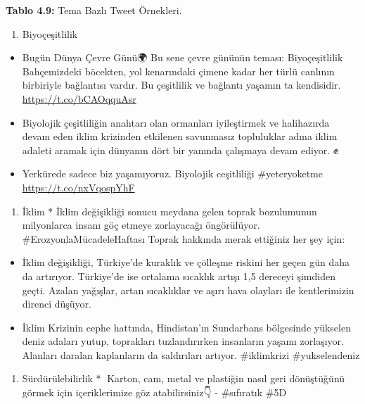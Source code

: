 \documentclass[
]{book}
\providecommand{\tightlist}{%
  \setlength{\itemsep}{0pt}\setlength{\parskip}{0pt}}
\begin{document}
\textbf{Tablo 4.9:} Tema Bazlı Tweet Örnekleri.

\begin{enumerate}
\def\labelenumi{\arabic{enumi})}
\tightlist
\item
  Biyoçeşitlilik\\
\end{enumerate}

\begin{itemize}
\item
  Bugün Dünya Çevre Günü🌍 Bu sene çevre gününün teması: Biyoçeşitlilik Bahçemizdeki böcekten, yol kenarındaki çimene kadar her türlü canlının birbiriyle bağlantısı vardır. Bu çeşitlilik ve bağlantı yaşamın ta kendisidir. \url{https://t.co/bCAOqquAsr}
\item
  Biyolojik çeşitliliğin anahtarı olan ormanları iyileştirmek ve halihazırda devam eden iklim krizinden etkilenen savunmasız topluluklar adına iklim adaleti aramak için dünyanın dört bir yanında çalışmaya devam ediyor. ✊
\item
  Yerkürede sadece biz yaşamıyoruz. Biyolojik ceşitliliği \#yeteryoketme \url{https://t.co/nxVqospYhF}
\end{itemize}

\begin{enumerate}
\def\labelenumi{\arabic{enumi})}
\setcounter{enumi}{1}
\tightlist
\item
  İklim * İklim değişikliği sonucu meydana gelen toprak bozulumunun milyonlarca insanı göç etmeye zorlayacağı öngörülüyor. \#ErozyonlaMücadeleHaftası Toprak hakkında merak ettiğiniz her şey için:
\end{enumerate}

\begin{itemize}
\item
  İklim değişikliği, Türkiye'de kuraklık ve çölleşme riskini her geçen gün daha da artırıyor. Türkiye'de ise ortalama sıcaklık artışı 1,5 dereceyi şimdiden geçti. Azalan yağışlar, artan sıcaklıklar ve aşırı hava olayları ile kentlerimizin direnci düşüyor.
\item
  İklim Krizinin cephe hattında, Hindistan'ın Sundarbans bölgesinde yükselen deniz adaları yutup, toprakları tuzlandırırken insanların yaşamı zorlaşıyor. Alanları daralan kaplanların da saldırıları artıyor. \#iklimkrizi \#yukselendeniz
\end{itemize}

\begin{enumerate}
\def\labelenumi{\arabic{enumi})}
\setcounter{enumi}{2}
\tightlist
\item
  Sürdürülebilirlik * 📌Karton, cam, metal ve plastiğin nasıl geri dönüştüğünü görmek için içeriklerimize göz atabilirsiniz👇 - \citet{tetrapak_tr} \citet{tcmeb} \#sıfıratık \#5D
\end{enumerate}
\end{document}
